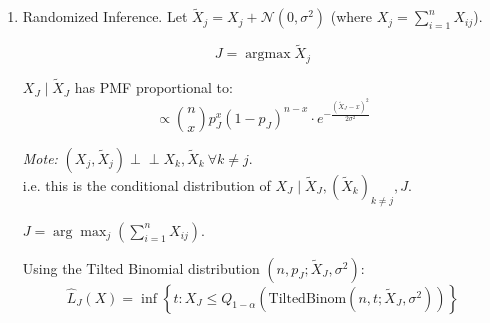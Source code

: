 \begin{enumerate}
\begin{center}
\end{center}

\[ \hat{L}_J(X) = \inf \left\{ t : \sum_{i=1}^n X_{iJ} \le Q_{1-\alpha}\left(\text{TruncBin}(n, t, 1+\max_{k \neq j} X_k, n)\right) \right\} \]


\item Randomized Inference. 
Let $\tilde{X}_j = X_j + \mathcal{N}(0, \sigma^2)$ \quad (where $X_j = \sum_{i=1}^n X_{ij}$).

\[ J = \operatorname*{argmax} \tilde{X}_j \]

\noindent $X_J \mid \tilde{X}_J$ has PMF proportional to:
\[ \propto \binom{n}{x} p_J^x (1-p_J)^{n-x} \cdot e^{-\frac{(\tilde{X}_J - x)^2}{2\sigma^2}} \]

\noindent \textit{Mote:} $(X_j, \tilde{X}_j) \perp\!\!\!\perp X_k, \tilde{X}_k \ \forall k \neq j$. \\
i.e. this is the conditional distribution of $X_J \mid \tilde{X}_J, (\tilde{X}_k)_{k \neq j}, J$.

$J = \arg\max_j \left( \sum_{i=1}^n X_{ij} \right)$.

Using the Tilted Binomial distribution $(n, p_J; \tilde{X}_J, \sigma^2)$:
$$ \hat{L}_J(X) = \inf \left\{ t : X_J \le Q_{1-\alpha}(\text{TiltedBinom}(n, t; \tilde{X}_J, \sigma^2)) \right\} $$

\end{enumerate}


